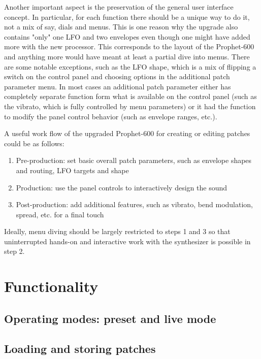 \documentclass[landscape, 11pt, oneside, twoside]{report}
\newenvironment{flowtext}{\addmargin[0cm]{0cm}}{\endaddmargin} %
\begin{document}
\begin{flowtext}
Another important aspect is the preservation of the general user interface concept. In particular, for each function there should be a unique way to do it, not a mix of say, dials and menus. This is one reason why the upgrade also contains "only" one LFO and two envelopes even though one might have added more with the new processor. This corresponds to the layout of the Prophet-600 and anything more would have meant at least a partial dive into menus. There are some notable exceptions, such as the LFO shape, which is a mix of flipping a switch on the control panel and choosing options in the additional patch parameter menu. In most cases an additional patch parameter either has completely separate function form what is available on the control panel (such as the vibrato, which is fully controlled by menu parameters) or it had the function to modify the panel control behavior (such as envelope ranges, etc.). 

A useful work flow of the upgraded Prophet-600 for creating or editing patches could be as follows:

\begin{enumerate}
  \item Pre-production: set basic overall patch parameters, such as envelope shapes and routing, LFO targets and shape
  \item Production: use the panel controls to interactively design the sound 
  \item Post-production: add additional features, such as vibrato, bend modulation, spread, etc. for a final touch
\end{enumerate} 

Ideally, menu diving should be largely restricted to steps 1 and 3 so that uninterrupted hands-on and interactive work with the synthesizer is possible in step 2. 

\pagebreak
\chapter{Functionality}\label{function}

\section{Operating modes: preset and live mode}\label{uimode}



\section{Loading and storing patches}\label{loadstorepatches}


\end{flowtext}
\end{document}
